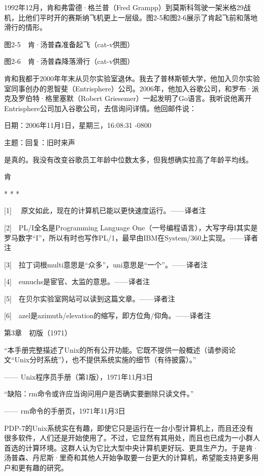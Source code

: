 \documentclass[a4paper,12pt,UTF8,twoside]{ctexbook}
\begin{document}
{1992年12月，肯和弗雷德·格兰普（Fred Grampp）到莫斯科驾驶一架米格29战机，比他们平时开的赛斯纳飞机更上一层级。图2-5和图2-6展示了肯起飞前和落地滑行的情形。



图2-5　肯·汤普森准备起飞（cat-v供图）



图2-6　肯·汤普森降落滑行（cat-v供图）

肯和我都于2000年年末从贝尔实验室退休。我去了普林斯顿大学，他加入贝尔实验室同事创办的恩智斐（Entrisphere）公司。2006年，他加入谷歌公司，和罗布·派克及罗伯特·格里塞默（Robert Griesemer）一起发明了Go语言。我听说他离开Entrisphere公司加入谷歌公司，去信询问详情。他回邮件说：



日期：2006年11月1日，星期三，16:08:31 -0800

主题：回复：旧时来声

是真的。我没有改变谷歌员工年龄中位数太多，但我想确实拉高了年龄平均线。

肯





* * *



[1]　 原文如此，现在的计算机已能以更快速度运行。——译者注

[2]　PL/I全名是Programming Language One（一号编程语言），大写字母I其实是罗马数字“I”，所以有时也写作PL/1，最早由IBM在System/360上实现。——译者注

[3]　拉丁词根multi意思是“众多”，uni意思是“一个”。——译者注

[4]　eunuchs是宦官、太监的意思。——译者注

[5]　在贝尔实验室网站可以读到这篇文章。——译者注

[6]　azel是azimuth/elevation的缩写，即方位角/仰角。——译者注





第3章　初版（1971）


“本手册完整描述了Unix的所有公开功能。它既不提供一般概述（请参阅论文“Unix分时系统”），也不提供系统实施的细节（有待披露）。”

—— Unix程序员手册（第1版），1971年11月3日

“缺陷：rm命令或许应当询问用户是否确实要删除只读文件。”

—— rm命令的手册页，1971年11月3日

PDP-7的Unix系统实在有趣，即使它只是运行在一台小型计算机上，而且还没有很多软件，人们还是开始使用了。不过，它显然有其用处，而且也已成为一小群人首选的计算环境。这群人认为它比大型中央计算机更好玩、更具生产力。于是肯·汤普森、丹尼斯·里奇和其他人开始争取要一台更大的计算机，希望能支持更多用户和更有趣的研究。

}
\end{document}
